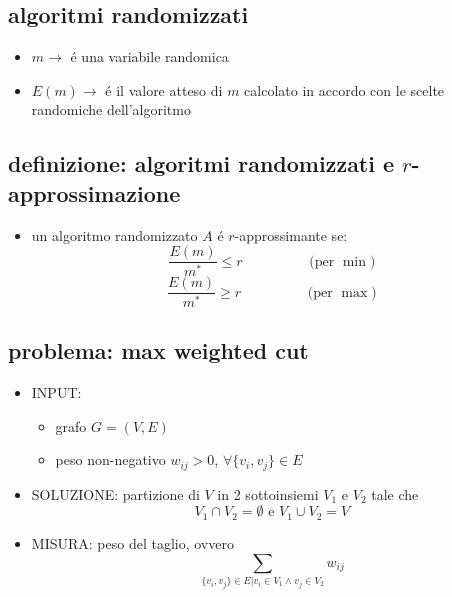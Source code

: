 
\subsection*{algoritmi randomizzati}
\begin{flushleft}
	\begin{itemize}
		\item $m\rightarrow$ \'e una variabile randomica
		\item $E(m)\rightarrow$ \'e il valore atteso di $m$ calcolato in accordo con le scelte randomiche dell'algoritmo
	\end{itemize}
\end{flushleft}


\subsection*{definizione: algoritmi randomizzati e $r$-approssimazione}
\begin{flushleft}
	\begin{itemize}
		\item un algoritmo randomizzato $A$ \'e $r$-approssimante se:
			$$\frac{E(m)}{m^*}\leq r\hspace{2cm}\text{(per }\min\text{)}$$
			$$\frac{E(m)}{m^*}\geq r\hspace{2cm}\text{(per }\max\text{)}$$
	\end{itemize}
\end{flushleft}


\subsection*{problema: max weighted cut}
\begin{flushleft}
	\begin{itemize}
		\item INPUT:
		\begin{itemize}
			\item grafo $G=(V,E)$
			\item peso non-negativo $w_{ij}>0$, $\forall\{v_i,v_j\}\in E$
		\end{itemize}
		\item SOLUZIONE: partizione di $V$ in 2 sottoinsiemi $V_1$ e $V_2$ tale che
			$$V_1\cap V_2=\emptyset\text{ e }V_1\cup V_2=V$$
		\item MISURA: peso del taglio, ovvero
			$$\sum_{\{v_i,v_j\}\in E\vert v_i\in V_1\wedge v_j\in V_2}w_{ij}$$
	\end{itemize}
\end{flushleft}

